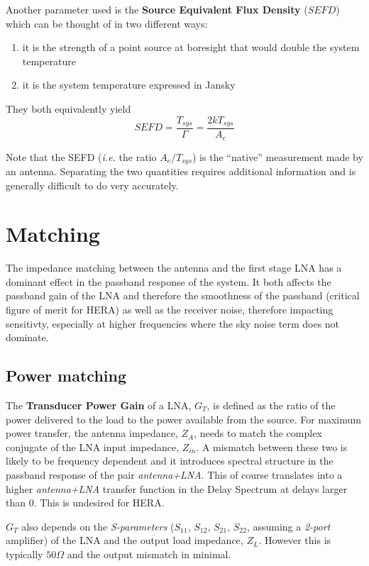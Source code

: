 \documentclass[11pt]{article}
\begin{document}
Another parameter used is the {\bf Source Equivalent Flux Density} ($SEFD$) which can be thought of in two different ways:
\begin{enumerate}
	\item it is the strength of a point source at boresight that would double the system temperature
	\item it is the system temperature expressed in Jansky
\end{enumerate}
They both equivalently yield
\begin{equation}
SEFD = \frac{T_{sys}}{\Gamma} = \frac{2kT_{sys}}{A_e}
\end{equation}

Note that the SEFD ({\em i.e.} the ratio $A_e/T_{sys}$) is the ``native'' measurement made by an antenna.  Separating the two quantities requires additional information and is generally difficult to do very accurately. 



\section{Matching}
The impedance matching between the antenna and the first stage LNA has a dominant effect in the passband response of the system. It both affects the passband gain of the LNA and therefore the smoothness of the passband (critical figure of merit for HERA) as well as the receiver noise, therefore impacting sensitivty, especially at higher frequencies where the sky noise term does not dominate.

\subsection{Power matching}
The {\bf Transducer Power Gain} of a LNA, $G_T$, is defined as the ratio of the power delivered to the load to the power available from the source.
For maximum power transfer, the antenna impedance, $Z_A$, needs to match the complex conjugate of the LNA input impedance, $Z_{in}$. A mismatch between these two is likely to be frequency dependent and it introduces spectral structure in the passband response of the pair {\em antenna+LNA}. This of course translates into a higher {\em antenna+LNA} transfer function in the Delay Spectrum at delays larger than 0. This is undesired for HERA.

$G_T$ also depends on the {\em S-parameters} ($S_{11}$, $S_{12}$, $S_{21}$, $S_{22}$, assuming a {\em 2-port} amplifier) of the LNA and the output load impedance, $Z_L$. However this is typically $50\Omega$ and the output mismatch in minimal.
\end{document}
